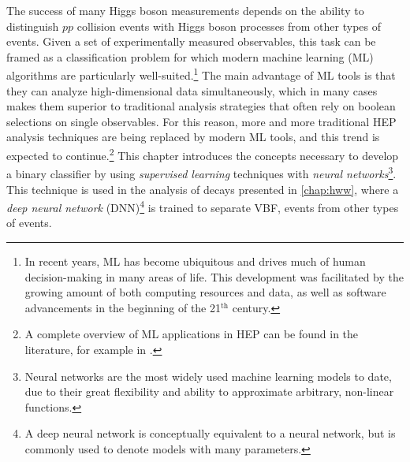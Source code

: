 The success of many Higgs boson measurements depends on the ability to distinguish $pp$ collision events with Higgs boson processes from other types of events. Given a set of experimentally measured observables, this task can be framed as a classification problem for which modern machine learning (ML) algorithms are particularly well-suited.\footnote{In recent years, ML has become ubiquitous and drives much of human decision-making in many areas of life. This development was facilitated by the growing amount of both computing resources and data, as well as software advancements in the beginning of the 21$^{\text{th}}$ century.}
The main advantage of ML tools is that they can analyze high-dimensional data simultaneously, which in many cases makes them superior to traditional analysis strategies that often rely on boolean selections on single observables. 
For this reason, more and more traditional HEP analysis techniques are being replaced by modern ML tools, and this trend is expected to continue.\footnote{A complete overview of ML applications in HEP can be found in the literature, for example in .}
This chapter introduces the concepts necessary to develop a binary classifier by using \emph{supervised learning} techniques with \emph{neural networks}\footnote{Neural networks are the most widely used machine learning models to date, due to their great flexibility and ability to approximate arbitrary, non-linear functions.}.
This technique is used in the analysis of \HWW decays presented in \cref{chap:hww}, where a \emph{deep neural network} (DNN)\footnote{A deep neural network is conceptually equivalent to a neural network, but is commonly used to denote models with many parameters.} is trained to separate VBF, \HWW events from other types of events.

